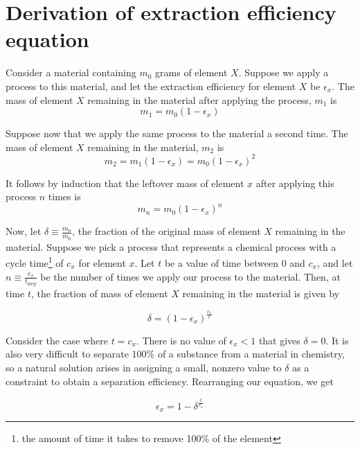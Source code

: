 \chapter{Derivation of extraction efficiency equation}
\label{appex:extraction-efficiency}

Consider a material containing $m_0$ grams of element $X$. Suppose we apply
a process to this material, and let the extraction efficiency for element $X$ be
$\epsilon_{x}$. The mass of element $X$ remaining in the material after applying
the process, $m_{1}$ is
\begin{equation}
   m_{1} = m_0(1-\epsilon_{x}) 
\end{equation}

Suppose now that we apply the same process to the material a second time. The mass of element $X$ remaining in the material, $m_{2}$ is 
\begin{equation}
    m_{2} = m_{1}(1-\epsilon_{x}) = m_0(1-\epsilon_{x})^{2}
\end{equation}

It follows by induction that the leftover mass of element $x$ after applying this
process $n$ times is
\begin{equation}
    m_{n} = m_0(1-\epsilon_{x})^{n}
\end{equation}

Now, let $\delta \equiv \frac{m_{n}}{m_0}$, the fraction of the original mass of
element $X$ remaining in the material. Suppose we pick a process that represents
a chemical process with a cycle time\footnote{the amount of time it takes
to remove 100\% of the element} of $c_{x}$ for element $x$. Let $t$ be a value
of time between 0 and $c_{x}$, and let $n \equiv \frac{c_{x}}{t_\text{step}}$ be
the number of times we apply our process to the material. Then, at time $t$, the
fraction of mass of element $X$ remaining in the material is given by

\begin{equation}
    \delta = (1-\epsilon_{x})^{\frac{c_{x}}{t}}
\end{equation}

Consider the case where $t=c_{x}$. There is no value of $\epsilon_{x} < 1$ that
gives $\delta = 0$. It is also very difficult to separate 100\% of a substance
from a material in chemistry, so a natural solution arises in assigning a small,
nonzero value to $\delta$ as a constraint to obtain a separation efficiency.
Rearranging our equation, we get

\begin{equation}
    \epsilon_{x} = 1 - \delta^{\frac{t}{c_{x}}}
\end{equation}


